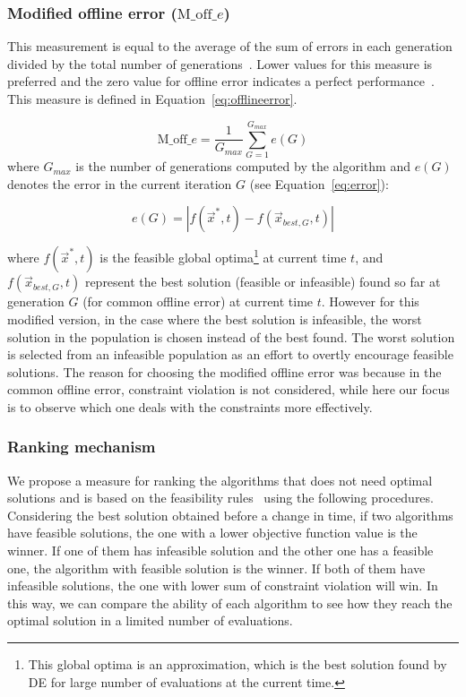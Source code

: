 \documentclass[review]{elsarticle}
\begin{document}
\subsubsection{Modified offline error ($\text{M\_off}\_e$)}
This measurement is equal to the average of the sum of errors in each generation divided by the total number of generations~\citep{nguyen2012continuous}. Lower values for this measure is preferred and the zero value for offline error indicates a perfect performance~\citep{Nguyen20121}. This measure is defined in Equation~\ref{eq:offlineerror}.

\begin{equation}
\text{M\_off}\_e= \frac{1}{G_{max}} \sum_{G = 1}^{G_{max}} e(G)
\label{eq:offlineerror}
\end{equation}
\noindent where $G_{max}$ is the number of generations computed by the algorithm and $e(G)$ denotes the error 
in the current iteration $G$ (see Equation~\ref{eq:error}):

\begin{equation}
	e(G)= |f(\vec{x}^*,t) - f(\vec{x}_{best,G},t)|
	\label{eq:error}
\end{equation}

\noindent where $f(\vec{x}^*,t)$ is the feasible global optima\footnote{This global optima is an approximation, which is the best solution found by DE for large number of evaluations at the current time.} at current time $t$, and $f(\vec{x}_{best,G},t)$ represent the best solution (feasible or infeasible) found so far at generation $G$  (for common offline error) at current time $t$. However for this modified version, in the case where the best solution is infeasible, the worst solution in the population is chosen instead of the best found. The worst solution is selected from an infeasible population as an effort to overtly encourage feasible solutions. The reason for choosing the modified offline error was because in the common offline error, constraint violation is not considered, while here our focus is to observe which one deals with the constraints more effectively.  

\subsubsection{Ranking mechanism}
We propose a measure for ranking the algorithms that does not need optimal solutions and is based on the feasibility rules~\citep{deb2000efficient} using the following procedures. Considering the best solution obtained before a change in time, if two algorithms have feasible solutions, the one with a lower objective function value is the winner. If one of them has infeasible solution and the other one has a feasible one, the algorithm with feasible solution is the winner. If both of them have infeasible solutions, the one with lower sum of constraint violation will win. 
In this way, we can compare the ability of each algorithm to see how they reach the optimal solution in a limited number of evaluations.
\end{document}
